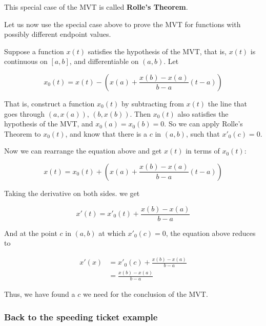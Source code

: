 \documentclass[pdftex, brazil, 12pt, twoside]{article}
\begin{document}
This special case of the MVT is called \textbf{Rolle's Theorem}.

Let us now use the special case above to prove the MVT for functions with possibly
different endpoint values.

Suppose a function $x(t)$
satisfies the hypothesis of the MVT, that is, $x(t)$ is continuous on $[a, b]$,
and differentiable on $(a, b)$. Let

\begin{equation}
  x_0(t) = x(t) - \left(x(a) + \frac{x(b) - x(a)}{b-a}(t-a)\right)
\end{equation}

That is, construct a function $x_0(t)$ by subtracting from $x(t)$ the line that goes through
$(a, x(a))$, $(b, x(b))$. Then $x_0(t)$ also satisfies the hypothesis of the MVT, and
$x_0(a) = x_0(b) = 0$. So we can apply Rolle's Theorem to $x_0(t)$, and know that there is a $c$
in $(a, b)$, such that $x'_0(c) = 0$.

Now we can rearrange the equation above and get $x(t)$ in terms of $x_0(t)$:

\begin{equation}
  x(t) = x_0(t) + \left(x(a) + \frac{x(b) - x(a)}{b-a}(t-a)\right)
\end{equation}

Taking the derivative on both sides. we get

\begin{equation}
  x'(t) = x'_0(t) + \frac{x(b) - x(a)}{b-a}
\end{equation}

And at the point $c$ in $(a, b)$ at which $x'_0(c) = 0$, the equation above reduces to

\begin{equation}
  \begin{split}
    x'(x) &= x'_0(c) + \frac{x(b) - x(a)}{b-a}\\
          &= \frac{x(b) - x(a)}{b-a}
  \end{split}
\end{equation}

Thus, we have found a $c$ we need for the conclusion of the MVT.

\subsubsection{Back to the speeding ticket example}
\label{u1-mvt-speed}
\end{document}
